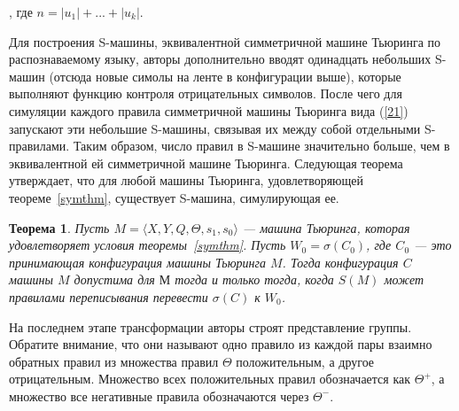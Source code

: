 \documentclass[14pt]{matmex-diploma-custom}
\newtheorem{thm}{Теорема}[subsection]
\begin{document}
, где $n = |u_1| + ... + |u_k|$.

Для построения S-машины, эквивалентной симметричной машине Тьюринга по распознаваемому языку, 
авторы дополнительно вводят одинадцать небольших S-машин (отсюда новые симолы на ленте 
в конфигурации выше), которые выполняют функцию контроля 
отрицательных символов. После чего для симуляции каждого правила симметричной машины Тьюринга вида (\ref{21})
запускают эти небольшие S-машины, связывая их между собой отдельными S-правилами. Таким образом,
число правил в S-машине значительно больше, чем в эквивалентной ей симметричной машине Тьюринга.
Следующая теорема утверждает, что для любой машины Тьюринга, удовлетворяющей теореме~\ref{symthm},
существует S-машина, симулирующая ее.

\begin{thm} \label{thmsm}
Пусть $M = \langle X, Y, Q, \Theta, s_1, s_0 \rangle$ --- машина Тьюринга, 
которая удовлетворяет условия теоремы~\ref{symthm}. Пусть $W_0 = \sigma(C_0)$, где $C_0$ --- это 
принимающая конфигурация машины Тьюринга $M$.
Тогда конфигурация $C$ машины $M$ допустима для $М$ тогда и только тогда, когда $S(M)$ может правилами переписывания перевести $\sigma (C)$ к $W_0$.
\end{thm}

На последнем этапе трансформации авторы строят представление группы.
Обратите внимание, что они называют одно правило из каждой пары взаимно обратных правил из множества правил $ \Theta $ положительным, а другое отрицательным.
Множество всех положительных правил обозначается как $ \Theta^+ $, а множество
все негативные правила обозначаются через $ \Theta^- $.
\end{document}
